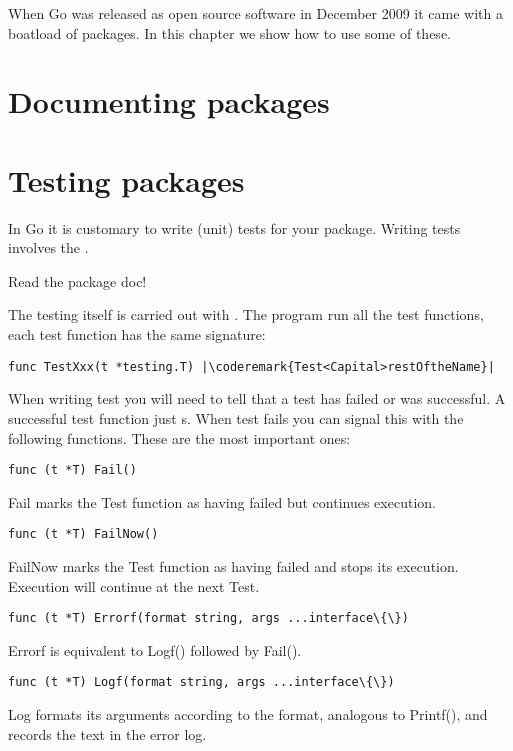 \noindent

When Go was released as open source software in December 2009 it came
with a boatload of packages. In this chapter we show how to use some
of these.


\section{Documenting packages}





\section{Testing packages}
In Go it is customary to write (unit) tests for your package. Writing
tests involves the .
\begin{lbar}
Read the package doc!
\end{lbar}

The testing itself is carried out with .
The  program run all the test functions, each
test function has the same signature:
\begin{lstlisting}
func TestXxx(t *testing.T) |\coderemark{Test<Capital>restOftheName}|
\end{lstlisting}

When writing test you will need to tell  that a test has failed or was successful. A
successful test function just s. When test fails you can signal this with the following
functions\cite{go_doc}. These are the most important ones:

\begin{lstlisting}
func (t *T) Fail()
\end{lstlisting}
Fail marks the Test function as having failed but continues execution.

\begin{lstlisting}
func (t *T) FailNow()
\end{lstlisting}
FailNow marks the Test function as having failed and stops its execution.
Execution will continue at the next Test.

\begin{lstlisting}
func (t *T) Errorf(format string, args ...interface\{\})
\end{lstlisting}
Errorf is equivalent to Logf() followed by Fail().

\begin{lstlisting}
func (t *T) Logf(format string, args ...interface\{\})
\end{lstlisting}
Log formats its arguments according to the format, analogous to Printf(),
and records the text in the error log.

